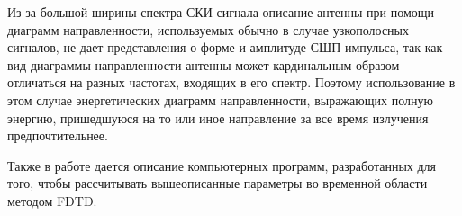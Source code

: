 Из-за большой ширины спектра СКИ-сигнала описание антенны
при помощи диаграмм направленности, используемых обычно в случае узкополосных
сигналов, не дает представления о форме и амплитуде СШП-импульса,
так как вид диаграммы направленности антенны
может кардинальным образом отличаться на разных частотах, входящих
в его спектр. Поэтому использование в этом случае
энергетических диаграмм направленности, выражающих полную энергию, пришедшуюся
на то или иное направление за все время излучения предпочтительнее.

Также в работе дается описание компьютерных программ, разработанных для того,
чтобы рассчитывать вышеописанные параметры во временной области методом FDTD.
